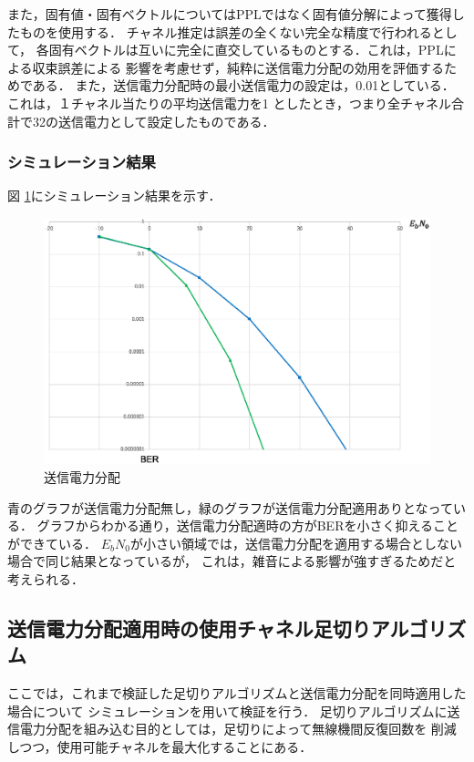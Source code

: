 また，固有値・固有ベクトルについてはPPLではなく固有値分解によって獲得したものを使用する．
チャネル推定は誤差の全くない完全な精度で行われるとして，
各固有ベクトルは互いに完全に直交しているものとする．これは，PPLによる収束誤差による
影響を考慮せず，純粋に送信電力分配の効用を評価するためである．
また，送信電力分配時の最小送信電力の設定は，0.01としている．これは，１チャネル当たりの平均送信電力を1
としたとき，つまり全チャネル合計で32の送信電力として設定したものである．

\subsubsection{シミュレーション結果}
図 \ref{figPconSim1}にシミュレーション結果を示す．

\begin{figure}[h]
    \centering
    \includegraphics[width=0.95\linewidth]{chapter4/figure/PconSim1.eps}
    \caption{送信電力分配}
    \label{figPconSim1}
\end{figure}

青のグラフが送信電力分配無し，緑のグラフが送信電力分配適用ありとなっている．
グラフからわかる通り，送信電力分配適時の方がBERを小さく抑えることができている．
$E_bN_0$が小さい領域では，送信電力分配を適用する場合としない場合で同じ結果となっているが，
これは，雑音による影響が強すぎるためだと考えられる．

\subsection{送信電力分配適用時の使用チャネル足切りアルゴリズム}
ここでは，これまで検証した足切りアルゴリズムと送信電力分配を同時適用した場合について
シミュレーションを用いて検証を行う．
足切りアルゴリズムに送信電力分配を組み込む目的としては，足切りによって無線機間反復回数を
削減しつつ，使用可能チャネルを最大化することにある．

